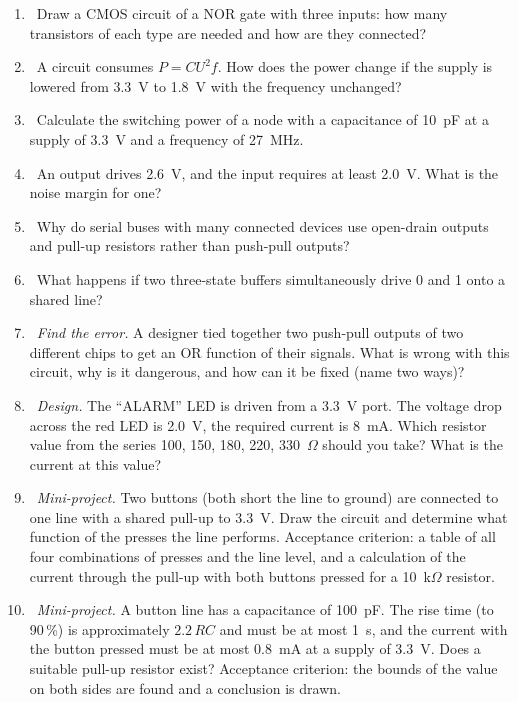 \begin{taskbox}
\begin{enumerate}
  \item {}~Draw a CMOS circuit of a NOR gate with three inputs: how many
        transistors of each type are needed and how are they connected?
  \item {}~A circuit consumes $P = C U^2 f$. How does the power change if the
        supply is lowered from 3.3~V to 1.8~V with the frequency unchanged?
  \item {}~Calculate the switching power of a node with a capacitance of 10~pF at a supply of
        3.3~V and a frequency of 27~MHz.
  \item {}~An output drives 2.6~V, and the input requires at least 2.0~V. What is the noise
        margin for one?
  \item {}~Why do serial buses with many connected
        devices use open-drain outputs and pull-up
        resistors rather than push-pull outputs?
  \item {}~What happens if two three-state buffers simultaneously
        drive 0 and 1 onto a shared line?
  \item {}~\emph{Find the error.} A designer tied together two
        push-pull outputs of two different chips to get an OR function
        of their signals. What is wrong with this circuit, why is it dangerous, and how can it be
        fixed (name two ways)?
  \item {}~\emph{Design.} The ``ALARM'' LED is driven from a 3.3~V
        port. The voltage drop across the red LED is 2.0~V, the
        required current is 8~mA. Which resistor value from the series 100, 150,
        180, 220, 330~$\Omega$ should you take? What is the current at this value?
  \item {}~\emph{Mini-project.} Two buttons (both short the line to ground)
        are connected to one line with a shared pull-up to 3.3~V.
        Draw the circuit and determine what function of the presses the
        line performs. Acceptance criterion: a table of all four combinations of presses and
        the line level, and a calculation of the current through the pull-up with both buttons pressed
        for a 10~k$\Omega$ resistor.
  \item {}~\emph{Mini-project.} A button line has a capacitance of 100~pF.
        The rise time (to 90\,\%) is approximately $2.2\,RC$ and must be at most
        1~\textmu s, and the current with the button pressed must be at most 0.8~mA at a supply of
        3.3~V. Does a suitable pull-up resistor exist? Acceptance criterion:
        the bounds of the value on both sides are found and a conclusion is drawn.
\end{enumerate}
\end{taskbox}

